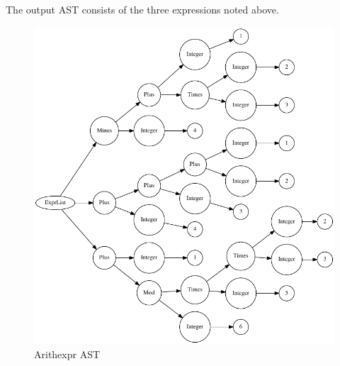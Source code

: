 %
The output AST consists of the three expressions noted above.
%

\begin{figure}[!ht]
	\centering
		\includegraphics{arith_expr_tree.pdf}
	\caption{Arithexpr AST}
	\label{fig:arith_expr_tree}
\end{figure}

